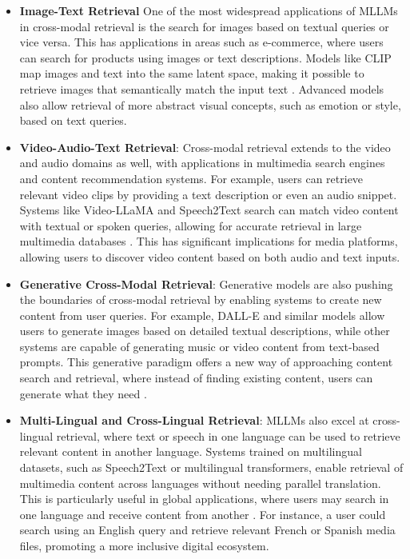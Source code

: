 \begin{itemize}

\item \textbf{Image-Text Retrieval} One of the most widespread applications of MLLMs in cross-modal retrieval is the search for images based on textual queries or vice versa. This has applications in areas such as e-commerce, where users can search for products using images or text descriptions. Models like CLIP map images and text into the same latent space, making it possible to retrieve images that semantically match the input text \cite{vs2024li}. Advanced models also allow retrieval of more abstract visual concepts, such as emotion or style, based on text queries.

\item \textbf{Video-Audio-Text Retrieval}: Cross-modal retrieval extends to the video and audio domains as well, with applications in multimedia search engines and content recommendation systems. For example, users can retrieve relevant video clips by providing a text description or even an audio snippet. Systems like Video-LLaMA and Speech2Text search can match video content with textual or spoken queries, allowing for accurate retrieval in large multimedia databases \cite{vs2014chen,vs2024gomez}. This has significant implications for media platforms, allowing users to discover video content based on both audio and text inputs.

\item \textbf{Generative Cross-Modal Retrieval}: Generative models are also pushing the boundaries of cross-modal retrieval by enabling systems to create new content from user queries. For example, DALL-E and similar models allow users to generate images based on detailed textual descriptions, while other systems are capable of generating music or video content from text-based prompts. This generative paradigm offers a new way of approaching content search and retrieval, where instead of finding existing content, users can generate what they need \cite{vs2024li,vs2019muller}.

\item \textbf{Multi-Lingual and Cross-Lingual Retrieval}: MLLMs also excel at cross-lingual retrieval, where text or speech in one language can be used to retrieve relevant content in another language. Systems trained on multilingual datasets, such as Speech2Text or multilingual transformers, enable retrieval of multimedia content across languages without needing parallel translation. This is particularly useful in global applications, where users may search in one language and receive content from another \cite{vs2024gomez,vs2024li}. For instance, a user could search using an English query and retrieve relevant French or Spanish media files, promoting a more inclusive digital ecosystem.


\end{itemize}
